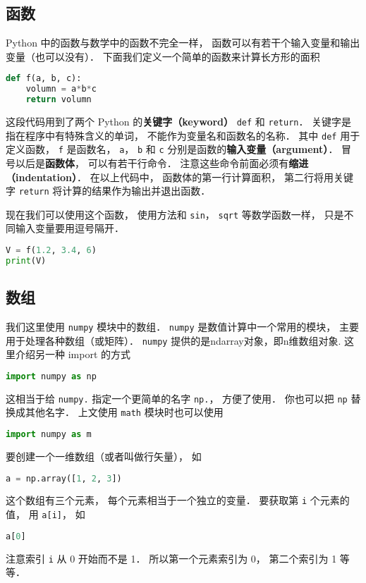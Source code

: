\subsection{函数}
Python 中的函数与数学中的函数不完全一样， 函数可以有若干个输入变量和输出变量（也可以没有）． 下面我们定义一个简单的函数来计算长方形的面积
\begin{lstlisting}[language=python]
def f(a, b, c):
    volumn = a*b*c
    return volumn
\end{lstlisting}
这段代码用到了两个 Python 的\textbf{关键字（keyword）} \verb|def| 和 \verb|return|． 关键字是指在程序中有特殊含义的单词， 不能作为变量名和函数名的名称． 其中 \verb|def| 用于定义函数， \verb|f| 是函数名， \verb|a|， \verb|b| 和 \verb|c| 分别是函数的\textbf{输入变量（argument）}． 冒号以后是\textbf{函数体}， 可以有若干行命令． 注意这些命令前面必须有\textbf{缩进（indentation）}．  在以上代码中， 函数体的第一行计算面积， 第二行将用关键字 \verb|return| 将计算的结果作为输出并退出函数．

现在我们可以使用这个函数， 使用方法和 \verb|sin|， \verb|sqrt| 等数学函数一样， 只是不同输入变量要用逗号隔开．
\begin{lstlisting}[language=python]
V = f(1.2, 3.4, 6)
print(V)
\end{lstlisting}

\subsection{数组}
我们这里使用 \verb|numpy| 模块中的数组． \verb|numpy| 是数值计算中一个常用的模块， 主要用于处理各种数组（或矩阵）． \verb|numpy| 提供的是ndarray对象，即n维数组对象. 这里介绍另一种 import 的方式
\begin{lstlisting}[language=python]
import numpy as np
\end{lstlisting}
这相当于给 \verb|numpy.| 指定一个更简单的名字 \verb|np.|， 方便了使用． 你也可以把 \verb|np| 替换成其他名字． 上文使用 \verb|math| 模块时也可以使用
\begin{lstlisting}[language=python]
import numpy as m
\end{lstlisting}

要创建一个一维数组（或者叫做行矢量）， 如
\begin{lstlisting}[language=python]
a = np.array([1, 2, 3])
\end{lstlisting}
这个数组有三个元素， 每个元素相当于一个独立的变量． 要获取第 \verb|i| 个元素的值， 用 \verb|a[i]|， 如
\begin{lstlisting}[language=python]
a[0]
\end{lstlisting}
注意索引 \verb|i| 从 0 开始而不是 1． 所以第一个元素索引为 0， 第二个索引为 1 等等．

